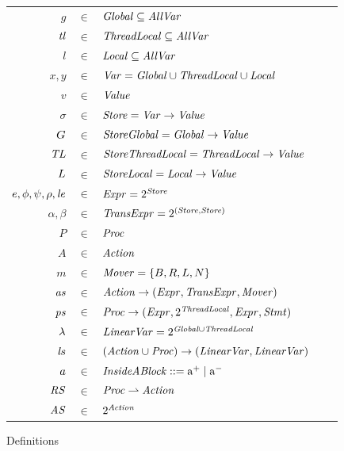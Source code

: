 \begin{figure}
\setlength{\tabcolsep}{3pt}
\begin{tabular}{rclcl}
$g$ & $\in$ & $\mathit{Global} \subseteq \mathit{AllVar}$ \\
$\mathit{tl}$ & $\in$ & $\mathit{ThreadLocal} \subseteq \mathit{AllVar}$ \\
$l$ & $\in$ & $\mathit{Local} \subseteq \mathit{AllVar}$ \\
$x,y$ & $\in$ & $\mathit{Var} = \mathit{Global} \cup \mathit{ThreadLocal} \cup \mathit{Local}$ \\
$v$ &  $\in$ & $\mathit{Value}$ \\
$\sigma$ & $\in$ & $\mathit{Store} = \mathit{Var} \rightarrow \mathit{Value}$ \\
$G$ & $\in$ & $\mathit{StoreGlobal} = \mathit{Global} \rightarrow \mathit{Value}$ \\
$\mathit{TL}$ & $\in$ & $\mathit{StoreThreadLocal} = \mathit{ThreadLocal}  \rightarrow \mathit{Value}$ \\
$L$ & $\in$ & $\mathit{StoreLocal} = \mathit{Local} \rightarrow \mathit{Value}$ \\
$e, \phi, \psi, \rho, \mathit{le}$ & $\in$ & $\mathit{Expr} = 2^{\mathit{Store}}$ \\
$\alpha, \beta$ & $\in$ & $\mathit{TransExpr} = 2^{(\mathit{Store},\mathit{Store})}$ \\
$P$ & $\in$ & $\mathit{Proc}$ \\
$A$ & $\in$ & $\mathit{Action}$ \\
$m$ & $\in$ & $\mathit{Mover} = \{B,R,L,N\}$\\
$\mathit{as}$ & $\in$ & $\mathit{Action} \rightarrow (\mathit{Expr}, \mathit{TransExpr}, \mathit{Mover})$ \\
$\mathit{ps}$ & $\in$ & $\mathit{Proc} \rightarrow (\mathit{Expr}, 2^{\mathit{ThreadLocal}}, \mathit{Expr}, \mathit{Stmt})$ \\
$\lambda$ & $\in$ & $\mathit{LinearVar} = 2^{\mathit{Global} \cup \mathit{ThreadLocal}}$ \\
$\mathit{ls}$ & $\in$ & $(\mathit{Action} \cup \mathit{Proc}) \rightarrow (\mathit{LinearVar}, \mathit{LinearVar})$ \\
$a$ & $\in$ & $\mathit{InsideABlock} ::= \mathrm{a^+} \mid \mathrm{a^-}$ \\
$\mathit{RS}$ & $\in$ & $\mathit{Proc} \rightharpoonup \mathit{Action}$ \\
$\mathit{AS}$ & $\in$ & $2^{\mathit{Action}}$ 
\end{tabular}
\caption{Definitions}
\label{fig:definitions}
\end{figure}

